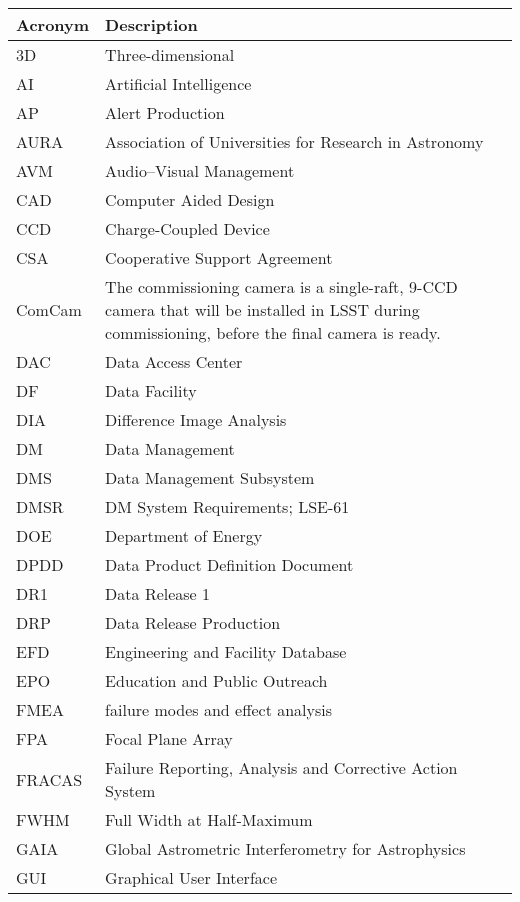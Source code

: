 \addtocounter{table}{-1}
\begin{longtable}{p{}p{}}\hline
\textbf{Acronym} & \textbf{Description}  \\\hline

3D & Three-dimensional \\\hline
AI & Artificial Intelligence \\\hline
AP & Alert Production \\\hline
AURA & Association of Universities for Research in Astronomy \\\hline
AVM & Audio--Visual Management \\\hline
CAD & Computer Aided Design \\\hline
CCD & Charge-Coupled Device \\\hline
CSA & Cooperative Support Agreement \\\hline
ComCam & The commissioning camera is a single-raft, 9-CCD camera that will be installed in LSST during commissioning, before the final camera is ready. \\\hline
DAC & Data Access Center \\\hline
DF & Data Facility \\\hline
DIA & Difference Image Analysis \\\hline
DM & Data Management \\\hline
DMS & Data Management Subsystem \\\hline
DMSR & DM System Requirements; LSE-61 \\\hline
DOE & Department of Energy \\\hline
DPDD & Data Product Definition Document \\\hline
DR1 & Data Release 1 \\\hline
DRP & Data Release Production \\\hline
EFD & Engineering and Facility Database \\\hline
EPO & Education and Public Outreach \\\hline
FMEA & failure modes and effect analysis \\\hline
FPA & Focal Plane Array \\\hline
FRACAS & Failure Reporting, Analysis and Corrective Action System \\\hline
FWHM & Full Width at Half-Maximum \\\hline
GAIA & Global Astrometric Interferometry for Astrophysics \\\hline
GUI & Graphical User Interface \\\hline

\end{longtable}
